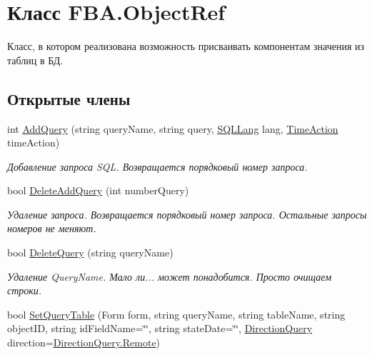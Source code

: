 \hypertarget{class_f_b_a_1_1_object_ref}{}\section{Класс F\+B\+A.\+Object\+Ref}
\label{class_f_b_a_1_1_object_ref}


Класс, в котором реализована возможность присваивать компонентам значения из таблиц в БД.  


\subsection*{Открытые члены}
\begin{DoxyCompactItemize}
\item 
int \mbox{\hyperlink{class_f_b_a_1_1_object_ref_a76c73e2eeffba036dc5075da9b539e94}{Add\+Query}} (string query\+Name, string query, \mbox{\hyperlink{namespace_f_b_a_aa7137ed2c5f5027f13bb403ffc2b005e}{S\+Q\+L\+Lang}} lang, \mbox{\hyperlink{namespace_f_b_a_a8f6da5d8d2dd8766bfe9052175a21970}{Time\+Action}} time\+Action)
\begin{DoxyCompactList}\small\item\em Добавление запроса S\+QL. Возвращается порядковый номер запроса. \end{DoxyCompactList}\item 
bool \mbox{\hyperlink{class_f_b_a_1_1_object_ref_a61819b35120285cd5df97a28ac2797ab}{Delete\+Add\+Query}} (int number\+Query)
\begin{DoxyCompactList}\small\item\em Удаление запроса. Возвращается порядковый номер запроса. Остальные запросы номеров не меняют. \end{DoxyCompactList}\item 
bool \mbox{\hyperlink{class_f_b_a_1_1_object_ref_aa3ebc2846b18935c180a209b1df946af}{Delete\+Query}} (string query\+Name)
\begin{DoxyCompactList}\small\item\em Удаление Query\+Name. Мало ли... может понадобится. Просто очищаем строки. \end{DoxyCompactList}\item 
bool \mbox{\hyperlink{class_f_b_a_1_1_object_ref_a7665db25c7d6cbe650824728783bcd54}{Set\+Query\+Table}} (Form form, string query\+Name, string table\+Name, string object\+ID, string id\+Field\+Name=\char`\"{}\char`\"{}, string state\+Date=\char`\"{}\char`\"{}, \mbox{\hyperlink{namespace_f_b_a_a6ff7d5c242d98046d1980715b06d7300}{Direction\+Query}} direction=\mbox{\hyperlink{namespace_f_b_a_a6ff7d5c242d98046d1980715b06d7300af8508f576cd3f742dfc268258dcdf0dd}{Direction\+Query.\+Remote}})

\end{DoxyCompactItemize}
